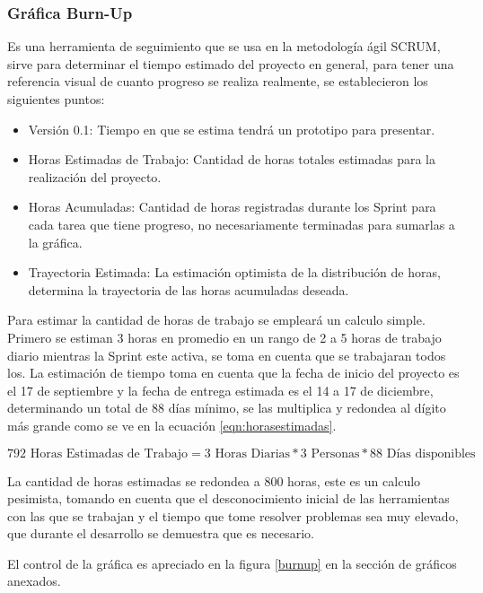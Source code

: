 \subsubsection{Gráfica Burn-Up}

Es una herramienta de seguimiento que se usa en la metodología ágil SCRUM, sirve para determinar el tiempo estimado del proyecto en general, para tener una referencia visual de cuanto progreso se realiza realmente, se establecieron los siguientes puntos:

\begin{itemize}
	\item Versión 0.1: Tiempo en que se estima tendrá un prototipo para presentar.
	\item Horas Estimadas de Trabajo: Cantidad de horas totales estimadas para la realización del proyecto.
	\item Horas Acumuladas: Cantidad de horas registradas durante los Sprint para cada tarea que tiene progreso, no necesariamente terminadas para sumarlas a la gráfica. 
	\item Trayectoria Estimada: La estimación optimista de la distribución de horas, determina la trayectoria de las horas acumuladas deseada.
\end{itemize}

Para estimar la cantidad de horas de trabajo se empleará un calculo simple.
 Primero se estiman 3 horas en promedio en un rango de 2 a 5 horas de trabajo diario mientras la Sprint este activa, se toma en cuenta que se trabajaran todos los. La estimación de tiempo toma en cuenta que la fecha de inicio del proyecto es el 17 de septiembre y la fecha de entrega estimada es el 14 a 17 de diciembre, determinando un total de 88 días mínimo, se las multiplica y redondea al dígito más grande como se ve en la ecuación \ref{eqn:horasestimadas}.
 
\begin{equation} 
\label{eqn:horasestimadas} 
	792 \text{ Horas Estimadas de Trabajo} = 3 \text{ Horas Diarias} * 3 \text{ Personas} * 88 \text{ Días disponibles}	
\end{equation}

La cantidad de horas estimadas se redondea a 800 horas, este es un calculo pesimista, tomando en cuenta que el desconocimiento inicial de las herramientas con las que se trabajan y el tiempo que tome resolver problemas sea muy elevado, que durante el desarrollo se demuestra que es necesario.

El control de la gráfica es apreciado en la figura \ref{burnup} en la sección de gráficos anexados.

